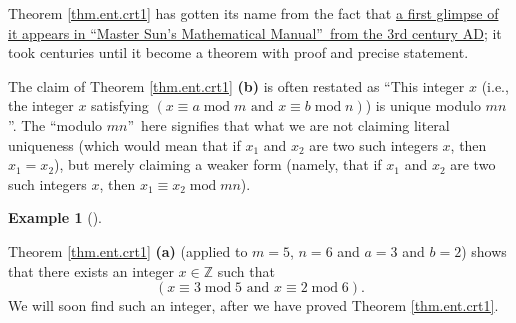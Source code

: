\documentclass[numbers=enddot,12pt,final,onecolumn,notitlepage]{scrartcl}%
\numberwithin{exer}{subsection}
\theoremstyle{definition}
\newtheorem{exam}[theo]{Example}
\newenvironment{example}[1][]
{\begin{exam}[#1]\begin{leftbar}}
{\end{leftbar}\end{exam}}
\begin{document}
Theorem \ref{thm.ent.crt1} has gotten its name from the fact that
\href{https://en.wikipedia.org/wiki/Chinese_remainder_theorem#History}{a first
glimpse of it appears in \textquotedblleft Master Sun's Mathematical
Manual\textquotedblright\ from the 3rd century AD}; it took centuries until it
become a theorem with proof and precise statement.

The claim of Theorem \ref{thm.ent.crt1} \textbf{(b)} is often restated as
\textquotedblleft This integer $x$ (i.e., the integer $x$ satisfying $\left(
x\equiv a\operatorname{mod}m\text{ and }x\equiv b\operatorname{mod}n\right)
$) is unique modulo $mn$\textquotedblright. The \textquotedblleft modulo
$mn$\textquotedblright\ here signifies that what we are not claiming literal
uniqueness (which would mean that if $x_{1}$ and $x_{2}$ are two such integers
$x$, then $x_{1}=x_{2}$), but merely claiming a weaker form (namely, that if
$x_{1}$ and $x_{2}$ are two such integers $x$, then $x_{1}\equiv
x_{2}\operatorname{mod}mn$).

\begin{example}
Theorem \ref{thm.ent.crt1} \textbf{(a)} (applied to $m=5$, $n=6$ and $a=3$ and
$b=2$) shows that there exists an integer $x\in\mathbb{Z}$ such that%
\[
\left(  x\equiv3\operatorname{mod}5\text{ and }x\equiv2\operatorname{mod}%
6\right)  .
\]
We will soon find such an integer, after we have proved Theorem
\ref{thm.ent.crt1}.
\end{example}
\end{document}
